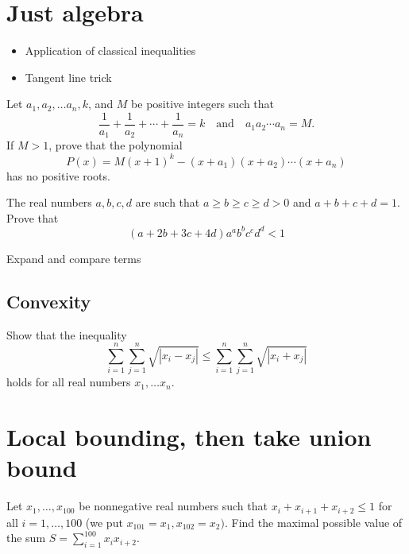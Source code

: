 \documentclass[11pt]{scrartcl}
\begin{document}
\clearpage

\section{Just algebra}
\begin{itemize}
    \item Application of classical inequalities
    \item Tangent line trick
\end{itemize}

\begin{Problem}
Let $a_1,a_2,\ldots a_n,k$, and $M$ be positive integers such that
$$\frac{1}{a_1}+\frac{1}{a_2}+\cdots+\frac{1}{a_n}=k\quad\text{and}\quad a_1a_2\cdots a_n=M.$$If $M>1$, prove that the polynomial
$$P(x)=M(x+1)^k-(x+a_1)(x+a_2)\cdots (x+a_n)$$has no positive roots.
\end{Problem}


\begin{Problem}
The real numbers $a, b, c, d$ are such that $a\geq b\geq c\geq d>0$ and $a+b+c+d=1$. Prove that
\[(a+2b+3c+4d)a^ab^bc^cd^d<1\]
\end{Problem}
\begin{lesson}
Expand and compare terms
\end{lesson}


\subsection{Convexity}
\begin{Problem}
Show that the inequality\[\sum_{i=1}^n \sum_{j=1}^n \sqrt{|x_i-x_j|}\leqslant \sum_{i=1}^n \sum_{j=1}^n \sqrt{|x_i+x_j|}\]holds for all real numbers $x_1,\ldots x_n.$
\end{Problem}




\section{Local bounding, then take union bound}

\begin{Problem}
Let $x_1, \ldots , x_{100}$ be nonnegative real numbers such that $x_i + x_{i+1} + x_{i+2} \leq 1$ for all $i = 1, \ldots , 100$ (we put $x_{101 } = x_1, x_{102} = x_2).$ Find the maximal possible value of the sum $S = \sum^{100}_{i=1} x_i x_{i+2}.$
\end{Problem}
\end{document}
